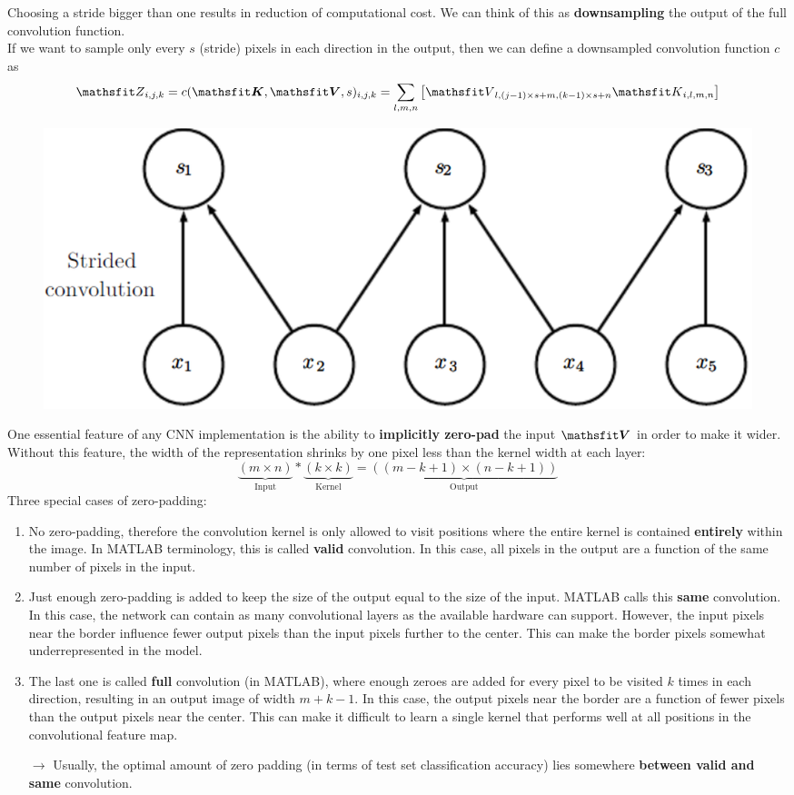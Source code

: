 \begin{multicols}{2}
	Choosing a stride bigger than one results in reduction of computational cost.
	We can think of this as \textbf{downsampling} the output of the full convolution function.\\
	If we want to sample only every $s$ (stride) pixels in each direction in the output, then we can define a downsampled convolution function $c$ as
	\[ \etZ_{i,j,k} = c(\tK,\tV,s)_{i,j,k} = \sum_{l,m,n}\left[ \etV_{l,(j-1)\times s+m,(k-1)\times s+n} \etK_{i,l,m,n} \right] \]
	\begin{figure}[H]
		\centering
		\includegraphics[width=0.5\linewidth]{images/strided_conv.PNG}
	\end{figure}

	One essential feature of any CNN implementation is the ability to\textbf{ implicitly zero-pad} the input $\tV$ in order to make it wider.
	Without this feature, the width of the representation shrinks by one pixel less than the kernel width at each layer:
	\[ \underbrace{(m\times n)}_{\text{Input}} \ast \underbrace{(k\times k)}_{\text{Kernel}} =
	\underbrace{\left( (m-k+1)\times (n-k+1) \right)}_{\text{Output}} \]
	Three special cases of zero-padding:
	\begin{enumerate}
		\item No zero-padding, therefore the convolution kernel is only allowed to visit positions where the entire kernel is contained \textbf{entirely} within the image. In MATLAB terminology, this is called \textbf{valid} convolution. In this case, all pixels in the output are a function of the same number of pixels in the input.
		\item Just enough zero-padding is added to keep the size of the output equal to the size of the input. MATLAB calls this \textbf{same} convolution. In this case, the network can contain as many convolutional layers as the available hardware can support. However, the input pixels near the border influence fewer output pixels than the input pixels further to the center. This can make the border pixels somewhat underrepresented in the model.
		\item The last one is called \textbf{full} convolution (in MATLAB), where enough zeroes are added for every pixel to be visited $k$ times in each direction, resulting in an output image of width $m+k-1$. In this case, the output pixels near the border are a function of fewer pixels than the output pixels near the center. This can make it difficult to learn a single kernel that performs well at all positions in the convolutional feature map.
		\item[$\rightarrow$] Usually, the optimal amount of zero padding (in terms of test set classification accuracy) lies somewhere \textbf{between valid and same} convolution.
	\end{enumerate}


\end{multicols}
